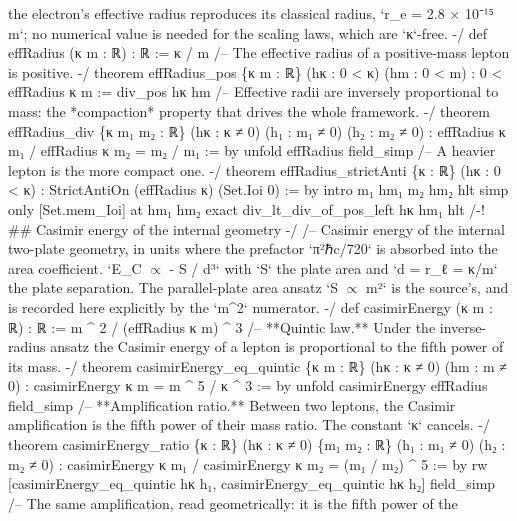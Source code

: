\documentclass[11pt,a4paper]{article}
\begin{document}
{the electron's effective radius reproduces its classical radius, `r\_\allowbreak{}e = 2.8 × 10⁻¹⁵ m`;
no numerical value is needed for the scaling laws, which are `κ`-free. -/
def effRadius (κ m : ℝ) : ℝ := κ / m
\mbox{}
/-- The effective radius of a positive-mass lepton is positive. -/
theorem effRadius\_\allowbreak{}pos \{κ m : ℝ\} (hκ : 0 \textless{} κ) (hm : 0 \textless{} m) : 0 \textless{} effRadius κ m :=
  div\_\allowbreak{}pos hκ hm
\mbox{}
/-- Effective radii are inversely proportional to mass: the *compaction* property
that drives the whole framework. -/
theorem effRadius\_\allowbreak{}div \{κ m₁ m₂ : ℝ\} (hκ : κ ≠ 0) (h₁ : m₁ ≠ 0) (h₂ : m₂ ≠ 0) :
    effRadius κ m₁ / effRadius κ m₂ = m₂ / m₁ := by
  unfold effRadius
  field\_\allowbreak{}simp
\mbox{}
/-- A heavier lepton is the more compact one. -/
theorem effRadius\_\allowbreak{}strictAnti \{κ : ℝ\} (hκ : 0 \textless{} κ) :
    StrictAntiOn (effRadius κ) (Set.Ioi 0) := by
  intro m₁ hm₁ m₂ hm₂ hlt
  simp only [Set.mem\_\allowbreak{}Ioi] at hm₁ hm₂
  exact div\_\allowbreak{}lt\_\allowbreak{}div\_\allowbreak{}of\_\allowbreak{}pos\_\allowbreak{}left hκ hm₁ hlt
\mbox{}
/-! \#\# Casimir energy of the internal geometry -/
\mbox{}
/-- Casimir energy of the internal two-plate geometry, in units where the
prefactor `π²ℏc/720` is absorbed into the area coefficient.
\mbox{}
`E\_\allowbreak{}C $\propto$ - S / d³` with `S` the plate area and `d = r\_\allowbreak{}ℓ = κ/m` the plate
separation.  The parallel-plate area ansatz `S $\propto$ m²` is the source's, and is
recorded here explicitly by the `m\textasciicircum{}2` numerator. -/
def casimirEnergy (κ m : ℝ) : ℝ := m \textasciicircum{} 2 / (effRadius κ m) \textasciicircum{} 3
\mbox{}
/-- **Quintic law.**  Under the inverse-radius ansatz the Casimir energy of a
lepton is proportional to the fifth power of its mass. -/
theorem casimirEnergy\_\allowbreak{}eq\_\allowbreak{}quintic \{κ m : ℝ\} (hκ : κ ≠ 0) (hm : m ≠ 0) :
    casimirEnergy κ m = m \textasciicircum{} 5 / κ \textasciicircum{} 3 := by
  unfold casimirEnergy effRadius
  field\_\allowbreak{}simp
\mbox{}
/-- **Amplification ratio.**  Between two leptons, the Casimir amplification is
the fifth power of their mass ratio.  The constant `κ` cancels. -/
theorem casimirEnergy\_\allowbreak{}ratio \{κ : ℝ\} (hκ : κ ≠ 0) \{m₁ m₂ : ℝ\} (h₁ : m₁ ≠ 0) (h₂ : m₂ ≠ 0) :
    casimirEnergy κ m₁ / casimirEnergy κ m₂ = (m₁ / m₂) \textasciicircum{} 5 := by
  rw [casimirEnergy\_\allowbreak{}eq\_\allowbreak{}quintic hκ h₁, casimirEnergy\_\allowbreak{}eq\_\allowbreak{}quintic hκ h₂]
  field\_\allowbreak{}simp
\mbox{}
/-- The same amplification, read geometrically: it is the fifth power of the
}
\end{document}
